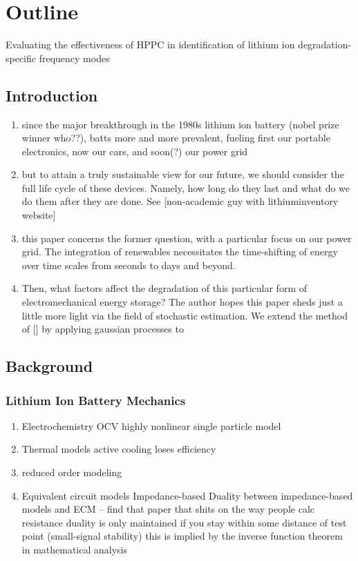 
\section{Outline}

Evaluating the effectiveness of HPPC in identification of lithium ion degradation-specific frequency modes

\subsection{Introduction}
\begin{enumerate}
  \item since the major breakthrough in the 1980s lithium ion battery (nobel prize winner who??), batts more and more prevalent, fueling first our portable electronics, now our cars, and soon(?) our power grid
  \item but to attain a truly sustainable view for our future, we should consider the full life cycle of these devices. Namely, how long do they last and what do we do them after they are done. See [non-academic guy with lithiuminventory website]
  \item this paper concerns the former question, with a particular focus on our power grid. The integration of renewables necessitates the time-shifting of energy over time scales from seconds to days and beyond.
  \item Then, what factors affect the degradation of this particular form of electromechanical energy storage? The author hopes this paper sheds just a little more light via the field of stochastic estimation. We extend the method of [] by applying gaussian processes to
\end{enumerate}

\subsection{Background}
\subsubsection{Lithium Ion Battery Mechanics}
\begin{enumerate}
  \item Electrochemistry
    \subitem OCV
    \subitem highly nonlinear
    \subitem single particle model
  \item Thermal models
    \subitem active cooling loses efficiency
  \item reduced order modeling
  \item Equivalent circuit models
    \subitem Impedance-based
    \subitem Duality between impedance-based models and ECM -- find that paper that shits on the way people calc resistance
    \subitem duality is only maintained if you stay within some distance of test point (small-signal stability) this is implied by the inverse function theorem in mathematical analysis
\end{enumerate}

